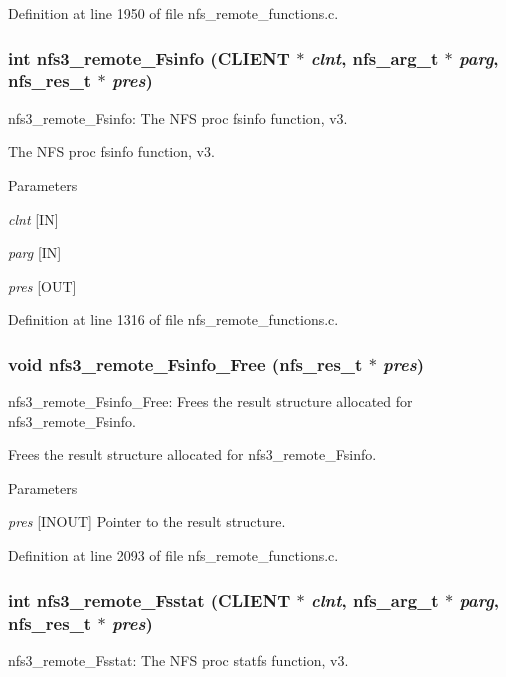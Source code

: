 Definition at line 1950 of file nfs\_\-remote\_\-functions.c.
\subsubsection[{nfs3\_\-remote\_\-Fsinfo}]{\setlength{\rightskip}{0pt plus 5cm}int nfs3\_\-remote\_\-Fsinfo (CLIENT $\ast$ {\em clnt}, \/  nfs\_\-arg\_\-t $\ast$ {\em parg}, \/  nfs\_\-res\_\-t $\ast$ {\em pres})}\label{group__NFSprocs_ga9010b5e8cfcb6fb7c0f94251be57fbf9}
nfs3\_\-remote\_\-Fsinfo: The NFS proc fsinfo function, v3.

The NFS proc fsinfo function, v3.


\begin{DoxyParams}{Parameters}
\item[{\em clnt}][IN] \item[{\em parg}][IN] \item[{\em pres}][OUT] \end{DoxyParams}


Definition at line 1316 of file nfs\_\-remote\_\-functions.c.
\subsubsection[{nfs3\_\-remote\_\-Fsinfo\_\-Free}]{\setlength{\rightskip}{0pt plus 5cm}void nfs3\_\-remote\_\-Fsinfo\_\-Free (nfs\_\-res\_\-t $\ast$ {\em pres})}\label{group__NFSprocs_ga0c270f30654ac2837e95465706aa69e3}
nfs3\_\-remote\_\-Fsinfo\_\-Free: Frees the result structure allocated for nfs3\_\-remote\_\-Fsinfo.

Frees the result structure allocated for nfs3\_\-remote\_\-Fsinfo.


\begin{DoxyParams}{Parameters}
\item[{\em pres}][INOUT] Pointer to the result structure. \end{DoxyParams}


Definition at line 2093 of file nfs\_\-remote\_\-functions.c.
\subsubsection[{nfs3\_\-remote\_\-Fsstat}]{\setlength{\rightskip}{0pt plus 5cm}int nfs3\_\-remote\_\-Fsstat (CLIENT $\ast$ {\em clnt}, \/  nfs\_\-arg\_\-t $\ast$ {\em parg}, \/  nfs\_\-res\_\-t $\ast$ {\em pres})}\label{group__NFSprocs_gacaf68e26bbfe72e9b23a06911afe6e0d}
nfs3\_\-remote\_\-Fsstat: The NFS proc statfs function, v3.

